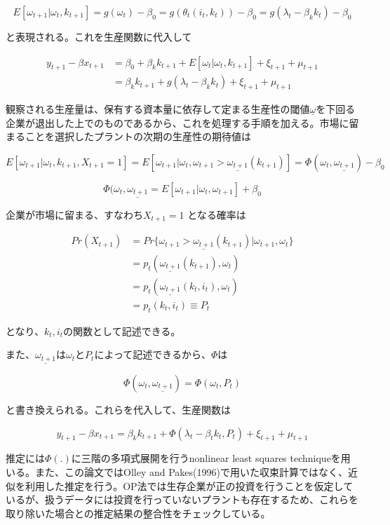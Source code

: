 \documentclass{jsarticle}
\begin{document}
\begin{enumerate}
\[ E[\omega_{t+1}|\omega_t, k_{t+1}] = g(\omega_t) - \beta_0 = g(\theta_t(i_t,k_t)) - \beta_0
= g(\lambda_t - \beta_k k_t) - \beta_0 \]

と表現される。これを生産関数に代入して

 \begin{align*}
 y_{t+1} - \beta x_{t+1} &= \beta_0 + \beta_k k_{t+1} + E[\omega_t | \omega_t, k_{t+1}] + \xi_{t+1} + \mu_{t+1} \\
 &= \beta_k k_{t+1} + g(\lambda_t - \beta_k k_t) + \xi_{t+1} + \mu_{t+1}
 \end{align*}
 
 観察される生産量は、保有する資本量に依存して定まる生産性の閾値$\underline{\omega}$を下回る企業が退出した上でのものであるから、これを処理する手順を加える。市場に留まることを選択したプラントの次期の生産性の期待値は
 
 \[E[\omega_{t+1} | \omega_t, k_{t+1}, X_{t+1}=1] 
 = E[\omega_{t+1}| \omega_t, \omega_{t+1} > \underline{\omega_{t+1}}(k_{t+1})]
 = \Phi (\omega_t, \underline{\omega_{t+1}}) - \beta_0 \]
 
 \[\Phi (\omega_t, \underline{\omega_{t+1}} = E[\omega_{t+1}| \omega_t, \omega_{t+1}] + \beta_0 \]
 
企業が市場に留まる、すなわち$X_{t+1} = 1$ となる確率は

 \begin{align*}
 Pr(X_{t+1}) &= Pr\{ \omega_{t+1} > \underline{\omega_{t+1}}(k_{t+1})| \omega_{t+1}, \omega_t \} \\
 &= p_t(\underline{\omega_{t+1}}(k_{t+1}), \omega_t) \\
 &= p_t(\underline{\omega_{t+1}}(k_t, i_t), \omega_t) \\
 &= p_t(k_t, i_t) \equiv P_t
 \end{align*}

となり、$k_t, i_t$の関数として記述できる。

また、$\underline{\omega_{t+1}}$は$\omega_t$と$P_t$によって記述できるから、$\Phi$は

\[ \Phi(\omega_t, \underline{\omega_{t+1}}) = \Phi(\omega_t, P_t) \]

と書き換えられる。これらを代入して、生産関数は

\[ y_{t+1} - \beta x_{t+1} = \beta_k k_{t+1} + \Phi( \lambda_t - \beta_t k_t, P_t) + \xi_{t+1} + \mu_{t+1} \]

推定には$\Phi(.)$に三階の多項式展開を行うnonlinear least squares techniqueを用いる。また、この論文ではOlley and Pakes(1996)で用いた収束計算ではなく、近似を利用した推定を行う。OP法では生存企業が正の投資を行うことを仮定しているが、扱うデータには投資を行っていないプラントも存在するため、これらを取り除いた場合との推定結果の整合性をチェックしている。


\end{enumerate}
\end{document}
